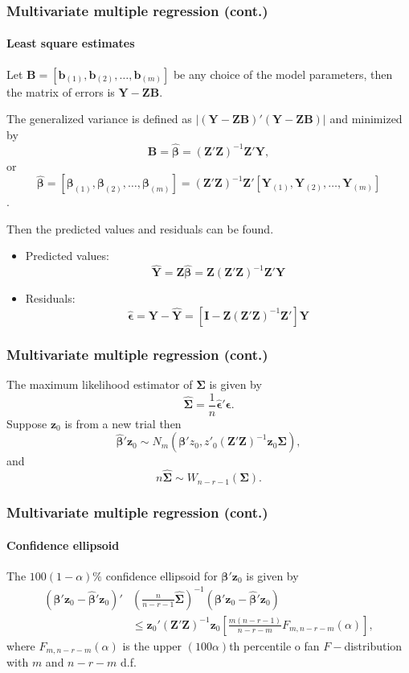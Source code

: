 \documentclass{beamer}
\begin{document}
	\begin{frame}
		\frametitle{Multivariate multiple regression (cont.)}
		\framesubtitle{Least square estimates}
		Let $\pmb{ B } = [ \pmb{ b }_{ ( 1 ) }, \pmb{ b }_{ ( 2 ) }, \dots, \pmb{ b }_{ ( m ) } ]$ be any choice of the model parameters, then the matrix of errors is $\pmb{ Y } - \pmb{ ZB }$.
		
		The generalized variance is defined as $| ( \pmb{ Y } - \pmb{ ZB } )'( \pmb{ Y } - \pmb{ ZB } ) |$ and minimized by 
		\[ \pmb{ B } = \hat{\pmb{ \beta }} = ( \pmb{ Z }'\pmb{ Z } ) ^ { -1 } \pmb{ Z }'\pmb{ Y }, \]
		or 
		\[ \hat{\pmb{ \beta }} = [ \pmb{ \beta }_{ ( 1 ) }, \pmb{ \beta }_{ ( 2 ) }, \dots, \pmb{ \beta }_{ ( m ) } ] = ( \pmb{ Z }'\pmb{ Z } ) ^ { -1 }\pmb{ Z }' [ \pmb{ Y }_{ ( 1 ) }, \pmb{ Y }_{ ( 2 ) }, \dots, \pmb{ Y }_{ ( m ) } ]\].
		
		Then the predicted values and residuals can be found.
		\begin{itemize}
			\item Predicted values: 
			\[ \hat{ \pmb{Y} } = \pmb{ Z } \hat{ \pmb{ \beta } } = \pmb{ Z } ( \pmb{Z}' \pmb{Z} ) ^ { -1 } \pmb{ Z }' \pmb{ Y } \]
			\item Residuals: \[ \hat{ \pmb{ \epsilon } } = \pmb{ Y } - \hat{ \pmb{ Y } } = [ \pmb{ I } - \pmb{ Z }( \pmb{ Z }'\pmb{ Z } ) ^ { -1 } \pmb{ Z }' ] \pmb{ Y } \]
		\end{itemize}
	\end{frame}
	
	\begin{frame}
		\frametitle{Multivariate multiple regression (cont.)}
		The maximum likelihood estimator of $\pmb{ \Sigma }$ is given by
		\[ \hat{\pmb{ \Sigma }} = \frac{ 1 }{ n } \hat{ \pmb{ \epsilon } }' \pmb{ \epsilon }. \]
		Suppose $\pmb{ z }_{ 0 }$ is from a new trial then 
		\[ \hat{ \pmb{ \beta } }' \pmb{ z }_0 \sim N_m( \pmb{ \beta }' z_0, z'_0( \pmb{ Z }'\pmb{ Z } )^ { -1 } \pmb{ z }_0 \pmb{ \Sigma } ), \]
		and 
		\[ n \hat{ \pmb{ \Sigma } } \sim W_{ n - r - 1 }( \pmb{ \Sigma } ). \]
	\end{frame}
	
	\begin{frame}
		\frametitle{Multivariate multiple regression (cont.)}
		\framesubtitle{Confidence ellipsoid}
		The $100( 1 - \alpha )\%$ confidence ellipsoid for $\pmb{ \beta }'\pmb{ z }_0$ is given by
		\begin{equation*}
		\begin{split}
			( \pmb{ \beta }'\pmb{z}_0 - \hat{\pmb{ \beta }}'\pmb{z}_0 )' & \left( \frac{ n }{ n - r - 1 } \hat{ \pmb{ \Sigma } } \right) ^ { -1 } ( \pmb{ \beta }'\pmb{z}_0 - \hat{\pmb{ \beta }}'\pmb{z}_0 ) \\
			& \leq \pmb{ z }_0'( \pmb{ Z }' \pmb{ Z } ) ^ { -1 } \pmb{ z }_0 \left[ \frac{ m( n - r - 1 ) }{ n - r - m } F_{ m, n - r - m }( \alpha ) \right],
		\end{split}
		\end{equation*}
		where $F_{ m, n - r - m }( \alpha )$ is the upper $(100\alpha)$th percentile  o fan $F-$distribution with $m$ and $n - r - m$ d.f.
	\end{frame}
	
\end{document}
